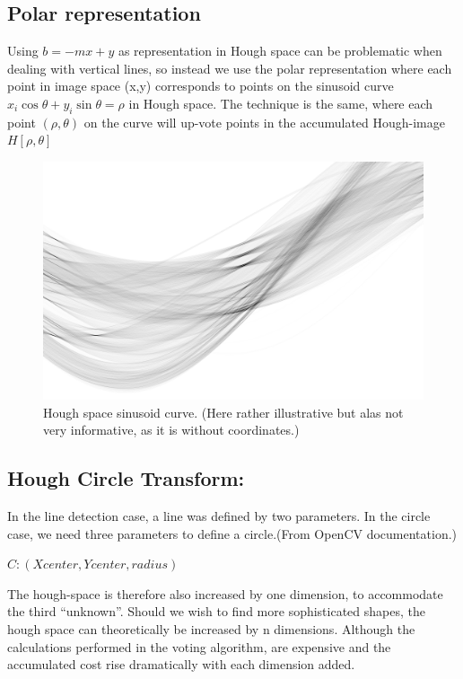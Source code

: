 \subsection{Polar representation}

Using $b = -mx +y$ as representation in Hough space can be problematic
when dealing with vertical lines, so instead we use the polar
representation where each point in image space (x,y) corresponds to
points on the sinusoid curve
$x_i \cos{ \theta } + y_i \sin{ \theta } = \rho$ in Hough space. The
technique is the same, where each point $( \rho, \theta)$ on the curve
will up-vote points in the accumulated Hough-image $H[ \rho , \theta]$

\begin{figure}[htbp]
\centering
\includegraphics{pics/hough/6.png}
\caption{Hough space sinusoid curve. (Here rather illustrative but alas
not very informative, as it is without coordinates.) \label{hough6}}
\end{figure}

\subsection{Hough Circle Transform:}

In the line detection case, a line was defined by two parameters. In the
circle case, we need three parameters to define a circle.(From OpenCV
documentation.)

$C: (Xcenter, Ycenter, radius)$

The hough-space is therefore also increased by one dimension, to
accommodate the third ``unknown''. Should we wish to find more
sophisticated shapes, the hough space can theoretically be increased by
n dimensions. Although the calculations performed in the voting
algorithm, are expensive and the accumulated cost rise dramatically with
each dimension added.

